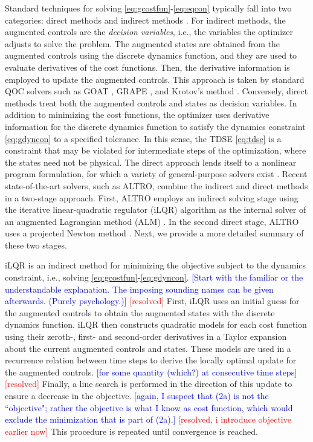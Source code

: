Standard techniques for solving \eqref{eq:gcostfun}-\eqref{eq:eqcon} typically
fall into two categories: direct methods \cite{Hargraves87, kelly2017introduction}
and indirect methods \cite{betts1998survey}. For indirect methods,
the augmented controls are the \emph{decision variables}, i.e., the
variables the optimizer adjusts to solve the problem.
The augmented states are obtained from the augmented controls using the discrete dynamics function,
and they are used to evaluate derivatives of the cost functions.
Then, the derivative information is employed to update the augmented controls.
This approach is taken by standard QOC solvers such as GOAT \cite{machnes2015tunable},
GRAPE \cite{khaneja2005optimal, leung2017speedup}, and Krotov's method \cite{goerz2019krotov}.
Conversely, direct methods treat both the augmented controls and states as decision
variables. In addition to minimizing the cost functions, the optimizer uses derivative information
for the discrete dynamics function to satisfy the dynamics constraint
\eqref{eq:gdyncon} to a specified tolerance.
In this sense, the TDSE \eqref{eq:tdse} is a constraint that may be violated
for intermediate steps of the optimization, where the states need not be physical.
The direct approach lends itself to a nonlinear program formulation, for which
a variety of general-purpose solvers exist \cite{gill2005snopt, wachter2006implementation}.
Recent state-of-the-art solvers, such as ALTRO,
combine the indirect and direct methods in a two-stage approach.
First, ALTRO employs an indirect solving stage using
the iterative linear-quadratic regulator (iLQR) algorithm
\cite{Li2004a} as the internal solver of an augmented Lagrangian method (ALM)
\cite{lantoine2012hybrid, plancher2017constrained, nocedal2006numerical}.
In the second direct stage, ALTRO uses a projected Newton method
\cite{bertsekas1982projected, rao1998application}.
Next, we provide a more detailed summary of these two stages.

iLQR is an indirect method
for minimizing the objective subject to the dynamics constraint,
i.e., solving \eqref{eq:gcostfun}-\eqref{eq:gdyncon}.
\textcolor{blue}{[Start with the familiar or the understandable explanation.
    The imposing sounding names can be given afterwards. (Purely psychology.)]}
\textcolor{red}{[resolved]}
First, iLQR uses an initial guess for the augmented controls to obtain the 
augmented states with the discrete dynamics function.
iLQR then constructs quadratic models for each cost function using
their zeroth-, first- and second-order derivatives in a Taylor expansion
about the current augmented controls and states.
These models are used in a recurrence relation between time steps
to derive the locally optimal update for the augmented controls.
\textcolor{blue}{[for some quantity (which?) at consecutive time steps]}
\textcolor{red}{[resolved]}
Finally, a line search \cite{zhang2006global}
is performed in the direction of this update to ensure a
decrease in the objective.
\textcolor{blue}{[again, I suspect that (2a) is not the ``objective"; rather the objective
    is what I know as cost function, which would exclude the minimization that is part of (2a).]}
\textcolor{red}{[resolved, i introduce objective earlier now]}
This procedure
is repeated until convergence is reached.

